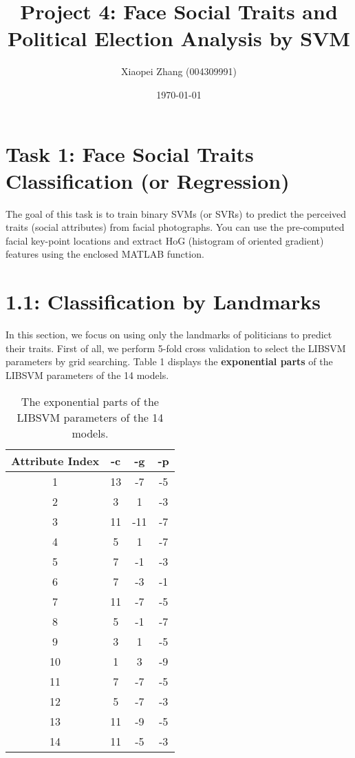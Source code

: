 \documentclass[10pt]{article}
\title{Project 4: Face Social Traits and Political Election Analysis by SVM}
\author{Xiaopei Zhang (004309991)}
\date{\today}
\begin{document}
\maketitle
\section*{\large{Task 1: Face Social Traits Classification (or Regression)}}
	The goal of this task is to train binary SVMs (or SVRs) to predict the perceived traits (social attributes) from facial photographs. You can use the pre-computed facial key-point locations and extract HoG (histogram of oriented gradient) features using the enclosed MATLAB function.\\ 
\section*{\small{1.1: Classification by Landmarks}}
	In this section, we focus on using only the landmarks of politicians to predict their traits. First of all, we perform 5-fold cross validation to select the LIBSVM parameters by grid searching. Table 1 displays the \textbf{exponential parts} of the LIBSVM parameters of the 14 models.\\
	\begin{table}[ht]
 		\centering
 		\begin{tabular}{|c|c|c|c|}
		\hline
		\textbf{Attribute Index} & \textbf{-c} & \textbf{-g} & \textbf{-p} \\ \hline
		1 & 13 & -7 & -5 \\ \hline
		2 & 3 & 1 & -3 \\ \hline
		3 & 11 & -11 & -7  \\ \hline
		4 & 5 & 1 & -7 \\ \hline
		5 & 7 & -1 & -3 \\ \hline
		6 & 7 & -3 & -1 \\ \hline
		7 & 11 & -7 & -5 \\ \hline
		8 & 5 & -1 & -7 \\ \hline
		9 & 3 & 1 & -5 \\ \hline
		10 & 1 & 3 & -9 \\ \hline
		11 & 7 & -7 & -5 \\ \hline
		12 & 5 & -7 & -3 \\ \hline
		13 & 11 & -9 & -5 \\ \hline
		14 & 11 & -5 & -3 \\ \hline
 		\end{tabular}
		\caption{The exponential parts of the LIBSVM parameters of the 14 models.}\label{tab1}
	\end{table}\\
\end{document}

